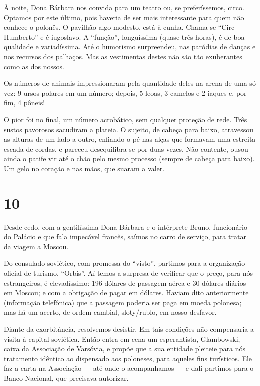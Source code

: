 À noite, Dona Bárbara nos convida para um teatro ou, se preferíssemos, circo. Optamos por este último, pois haveria de ser mais interessante para quem não conhece o polonês. O pavilhão algo modesto, está à cunha. Chama-se ``Circ Humberto'' e é iugoslavo. A ``função'', longuíssima (quase três horas), é de boa qualidade e variadíssima. Até o humorismo surpreendeu, nas paródias de danças e nos recursos dos palhaços. Mas as vestimentas destes não são tão exuberantes como as dos nossos.

Os números de animais impressionaram pela quantidade deles na arena de uma só vez: 9 ursos polares em um número; depois, 5 leoas, 3 camelos e 2 iaques e, por fim, 4 pôneis!

O pior foi no final, um número acrobático, sem qualquer proteção de rede. Três sustos pavorosos sacudiram a plateia. O sujeito, de cabeça para baixo, atravessou as alturas de um lado a outro, enfiando o pé nas alças que formavam uma estreita escada de cordas, e pareceu desequilibra-se por duas vezes. Não contente, ousou ainda o patife vir até o chão pelo mesmo processo (sempre de cabeça para baixo). Um gelo no coração e nas mãos, que suaram a valer.

\section*{10 \adfflatleafright {}}
Desde cedo, com a gentilíssima Dona Bárbara e o intérprete Bruno, funcionário do Palácio e que fala impecável francês, saímos no carro de serviço, para tratar da viagem a Moscou.

Do consulado soviético, com promessa do ``visto'', partimos para a organização oficial de turismo, ``Orbis''. Aí temos a surpresa de verificar que o preço, para nós estrangeiros, é elevadíssimo: 196 dólares de passagem aérea e 30 dólares diários em Moscou; e com a obrigação de pagar em dólares. Haviam dito anteriormente (informação telefônica) que a passagem poderia ser paga em moeda polonesa; mas há um acerto, de ordem cambial, sloty/rublo, em nosso desfavor.

Diante da exorbitância, resolvemos desistir. Em tais condições não compensaria a visita à capital soviética. Então entra em cena um esperantista, Glambowski, caixa da Associação de Varsóvia, e propõe que a sua entidade pleiteie para nós tratamento idêntico ao dispensado aos poloneses, para aqueles fins turísticos. Ele faz a carta na Associação --- até onde o acompanhamos --- e dali partimos para o Banco Nacional, que precisava autorizar.

